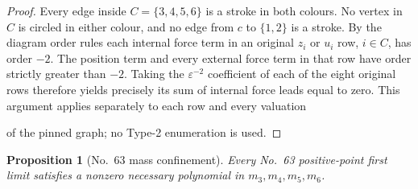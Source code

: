 \documentclass[11pt]{amsart}
\newtheorem{proposition}[theorem]{Proposition}
\theoremstyle{remark}
\begin{document}
\begin{proof}

Every edge inside $C=\{3,4,5,6\}$ is a stroke in both
colours. No vertex in $C$ is circled in either colour,
and no edge from $c$ to $\{1,2\}$ is a stroke. By the
diagram order rules each internal force term in an
original $z_i$ or $u_i$ row, $i\in C$, has order $-2$.
The position term and every external force term in that
row have order strictly greater than $-2$. Taking the
$\varepsilon^{-2}$ coefficient of each of the eight
original rows therefore yields precisely its sum of
internal force leads equal to zero. This argument
applies separately to each row and every valuation

of the pinned graph; no Type-2 enumeration is used.
\end{proof}

\begin{proposition}[No.~63 mass confinement]\label{prop:no63-locus}
Every No.~63 positive-point first limit satisfies a nonzero
necessary polynomial in $m_3,m_4,m_5,m_6$.

\end{proposition}
\end{document}
